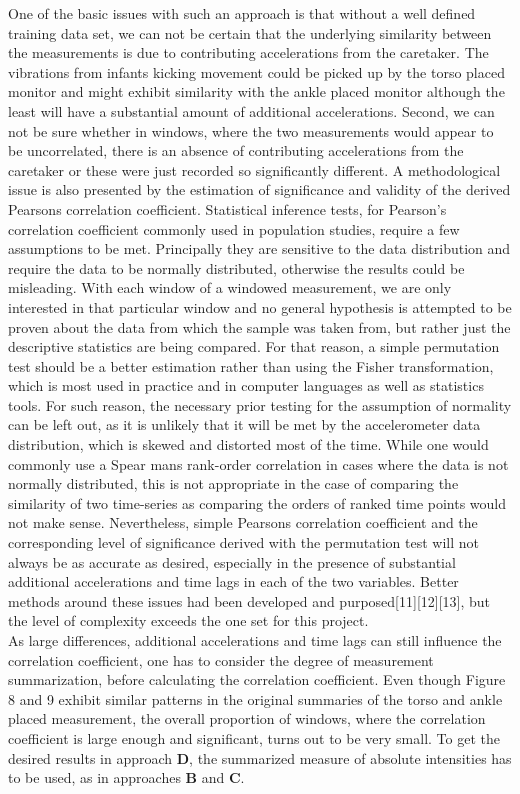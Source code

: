 \documentclass{article}
\begin{document}
{One of the basic issues with such an approach is that without a well defined training data set, we can not be certain that the underlying similarity between the measurements is due to contributing accelerations from the caretaker. The vibrations from infants kicking movement could be picked up by the torso placed monitor and might exhibit similarity with the ankle placed monitor although the least will have a substantial amount of additional accelerations. Second, we can not be sure whether in windows, where the two measurements would appear to be uncorrelated, there is an absence of contributing accelerations from the caretaker or these were just recorded so significantly different. A methodological issue is also presented by the estimation of significance and validity of the derived Pearsons correlation coefficient. Statistical inference tests, for Pearson's correlation coefficient commonly used in population studies, require a few assumptions to be met. Principally they are sensitive to the data distribution and require the data to be normally distributed, otherwise the results could be misleading. With each window of a windowed measurement, we are only interested in that particular window and no general hypothesis is attempted to be proven about the data from which the sample was taken from, but rather just the descriptive statistics are being compared. For that reason, a simple permutation test should be a better estimation rather than using the Fisher transformation, which is most used in practice and in computer languages as well as statistics tools. For such reason, the necessary prior testing for the assumption of normality can be left out, as it is unlikely that it will be met by the accelerometer data distribution, which is skewed and distorted most of the time. While one would commonly use a Spear mans rank-order correlation in cases where the data is not normally distributed, this is not appropriate in the case of comparing the similarity of two time-series as comparing the orders of ranked time points would not make sense. Nevertheless, simple Pearsons correlation coefficient and the corresponding level of significance derived with the permutation test will not always be as accurate as desired, especially in the presence of substantial additional accelerations and time lags in each of the two variables. Better methods around these issues had been developed and purposed[11][12][13], but the level of complexity exceeds the one set for this project. 
\\As large differences, additional accelerations and time lags can still influence the correlation coefficient, one has to consider the degree of measurement summarization, before calculating the correlation coefficient. Even though Figure 8 and 9 exhibit similar patterns in the original summaries of the torso and ankle placed measurement, the overall proportion of windows, where the correlation coefficient is large enough and significant, turns out to be very small. To get the desired results in approach \textbf{D}, the summarized measure of absolute intensities has to be used, as in approaches \textbf{B} and \textbf{C}.\\ 
}
\end{document}
